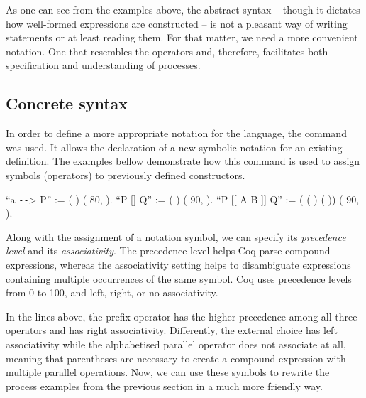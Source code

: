As one can see from the examples above, the abstract syntax -- though it dictates how well-formed expressions are constructed -- is not a pleasant way of writing statements or at least reading them. For that matter, we need a more convenient notation. One that resembles the \CSPM{} operators and, therefore, facilitates both specification and understanding of \CSPcoq{} processes.

\subsection{Concrete syntax}
\label{sec:concrete-syntax}

In order to define a more appropriate notation for the \CSPcoq{} language, the command  was used. It allows the declaration of a new symbolic notation for an existing definition. The examples bellow demonstrate how this command is used to assign symbols (operators) to previously defined constructors.

\begin{coqdoccode}
	\coqdocnoindent
	 ``a \texttt{-{}-}> P'' := (  ) (  80,  ).\coqdoceol
	\coqdocnoindent
	 ``P [] Q'' := (  ) (  90,  ).\coqdoceol
	\coqdocnoindent
	 ``P [[ A  B ]] Q'' := (   ( ) ( ))
	\coqdoceol\coqdocnoindent (  90,  ).\coqdoceol
\end{coqdoccode}

Along with the assignment of a notation symbol, we can specify its \emph{precedence level} and its \emph{associativity}. The precedence level helps Coq parse compound expressions, whereas the associativity setting helps to disambiguate expressions containing multiple occurrences of the same symbol. Coq uses precedence levels from 0 to 100, and left, right, or no associativity.

In the lines above, the prefix operator has the higher precedence among all three operators and has right associativity. Differently, the external choice has left associativity while the alphabetised parallel operator does not associate at all, meaning that parentheses are necessary to create a compound expression with multiple parallel operations. Now, we can use these symbols to rewrite the process examples from the previous section in a much more friendly way.

